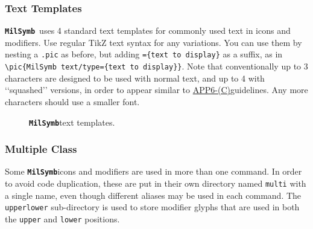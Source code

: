 \documentclass[a4paper, titlepage]{article}
\newcommand\MilSymb{\textbf{\texttt{MilSymb}}}
\newcommand\DocLink{\href{https://www.awl.edu.pl/images/en/APP_6_C.pdf}{APP6-(C)}}
\begin{document}
\subsubsection{Text Templates}
\label{text}

\MilSymb\  uses 4 standard text templates for commonly used text in icons and modifiers. Use regular TikZ text syntax for any variations. You can use them by nesting a \texttt{.pic} as before, but adding \texttt{=\{text to display\}} as a suffix, as in \texttt{\textbackslash pic\{MilSymb text/type=\{text to display\}\}}. Note that conventionally up to 3 characters are designed to be used with normal text, and up to 4 with \lq\lq{}squashed\rq\rq{} versions, in order to appear similar to \DocLink guidelines. Any more characters should use a smaller font.

\begin{figure}[H]
\centering
{}
\caption{\MilSymb text templates.}
\end{figure}

\subsubsection{Multiple Class}
\label{multi} 

Some \MilSymb icons and modifiers are used in more than one command. In order to avoid code duplication, these are put in their own directory named \texttt{multi} with a single name, even though different aliases may be used in each command. The \texttt{upperlower} sub-directory is used to store modifier glyphs that are used in both the \texttt{upper} and \texttt{lower} positions.
\end{document}
